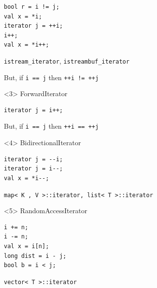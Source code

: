 \documentclass{beamer}
\begin{document}
{\begin{frame}[fragile]
\begin{columns}[T]
\begin{column}{0.55\textwidth}
\begin{onlyenv}
         \begin{lstlisting}
bool r = i != j;
val x = *i;
iterator j = ++i;
i++;
val x = *i++;
         \end{lstlisting}
{\tt istream\_iterator}, {\tt istreambuf\_iterator}

          \vspace{2ex}
          But, if {\tt i == j} then {\tt ++i != ++j}
      \end{onlyenv}
      \begin{onlyenv}<3>
         ForwardIterator
         \begin{lstlisting}
iterator j = i++;
         \end{lstlisting}

          \vspace{2ex}
          But, if {\tt i == j} then {\tt ++i == ++j}
      \end{onlyenv}
      \begin{onlyenv}<4>
         BidirectionalIterator
         \begin{lstlisting}
iterator j = --i;
iterator j = i--;
val x = *i--;
         \end{lstlisting}
         {\tt map< K , V >::iterator, list< T >::iterator}
      \end{onlyenv}
      \begin{onlyenv}<5>
         RandomAccessIterator
         \begin{lstlisting}
i += n;
i -= n;
val x = i[n];
long dist = i - j;
bool b = i < j;
         \end{lstlisting}
         {\tt vector< T >::iterator}
      \end{onlyenv}
    \end{column}
  \end{columns}
\end{frame}
}
\end{document}
